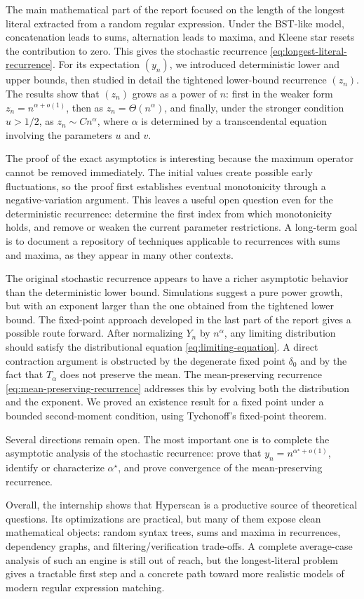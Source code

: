 The main mathematical part of the report focused on the length of the longest literal extracted from a random regular expression. Under the BST-like model, concatenation leads to sums, alternation leads to maxima, and Kleene star resets the contribution to zero. This gives the stochastic recurrence \eqref{eq:longest-literal-recurrence}. For its expectation $(y_n)$, we introduced deterministic lower and upper bounds, then studied in detail the tightened lower-bound recurrence $(z_n)$. The results show that $(z_n)$ grows as a power of $n$: first in the weaker form $z_n=n^{\alpha+o(1)}$, then as $z_n=\Theta(n^\alpha)$, and finally, under the stronger condition $u>1/2$, as $z_n\sim Cn^\alpha$, where $\alpha$ is determined by a transcendental equation involving the parameters $u$ and $v$.

The proof of the exact asymptotics is interesting because the maximum operator cannot be removed immediately. The initial values create possible early fluctuations, so the proof first establishes eventual monotonicity through a negative-variation argument. This leaves a useful open question even for the deterministic recurrence: determine the first index from which monotonicity holds, and remove or weaken the current parameter restrictions. A long-term goal is to document a repository of techniques applicable to recurrences with sums and maxima, as they appear in many other contexts.

The original stochastic recurrence appears to have a richer asymptotic behavior than the deterministic lower bound. Simulations suggest a pure power growth, but with an exponent larger than the one obtained from the tightened lower bound. The fixed-point approach developed in the last part of the report gives a possible route forward. After normalizing $Y_n$ by $n^\alpha$, any limiting distribution should satisfy the distributional equation \eqref{eq:limiting-equation}. A direct contraction argument is obstructed by the degenerate fixed point $\delta_0$ and by the fact that $T_\alpha$ does not preserve the mean. The mean-preserving recurrence \eqref{eq:mean-preserving-recurrence} addresses this by evolving both the distribution and the exponent. We proved an existence result for a fixed point under a bounded second-moment condition, using Tychonoff's fixed-point theorem.

Several directions remain open. The most important one is to complete the asymptotic analysis of the stochastic recurrence: prove that $y_n=n^{\alpha^\star+o(1)}$, identify or characterize $\alpha^\star$, and prove convergence of the mean-preserving recurrence.

Overall, the internship shows that Hyperscan is a productive source of theoretical questions. Its optimizations are practical, but many of them expose clean mathematical objects: random syntax trees, sums and maxima in recurrences, dependency graphs, and filtering/verification trade-offs. A complete average-case analysis of such an engine is still out of reach, but the longest-literal problem gives a tractable first step and a concrete path toward more realistic models of modern regular expression matching.

